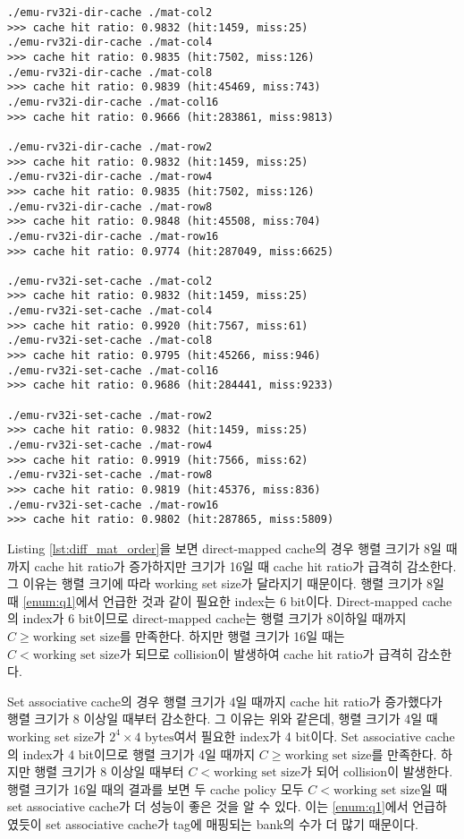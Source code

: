 \documentclass[
    a4paper,
    oneside,
    adjustmath,
    finemath,
    itemph,
    nonfrench,
    11pt
]{oblivoir}
\begin{document}
\begin{enumerate}
        \begin{lstlisting}[caption=Difference by matrix order, label=lst:diff_mat_order]
./emu-rv32i-dir-cache ./mat-col2
>>> cache hit ratio: 0.9832 (hit:1459, miss:25)
./emu-rv32i-dir-cache ./mat-col4
>>> cache hit ratio: 0.9835 (hit:7502, miss:126)
./emu-rv32i-dir-cache ./mat-col8
>>> cache hit ratio: 0.9839 (hit:45469, miss:743)
./emu-rv32i-dir-cache ./mat-col16
>>> cache hit ratio: 0.9666 (hit:283861, miss:9813)

./emu-rv32i-dir-cache ./mat-row2
>>> cache hit ratio: 0.9832 (hit:1459, miss:25)
./emu-rv32i-dir-cache ./mat-row4
>>> cache hit ratio: 0.9835 (hit:7502, miss:126)
./emu-rv32i-dir-cache ./mat-row8
>>> cache hit ratio: 0.9848 (hit:45508, miss:704)
./emu-rv32i-dir-cache ./mat-row16
>>> cache hit ratio: 0.9774 (hit:287049, miss:6625)

./emu-rv32i-set-cache ./mat-col2
>>> cache hit ratio: 0.9832 (hit:1459, miss:25)
./emu-rv32i-set-cache ./mat-col4
>>> cache hit ratio: 0.9920 (hit:7567, miss:61)
./emu-rv32i-set-cache ./mat-col8
>>> cache hit ratio: 0.9795 (hit:45266, miss:946)
./emu-rv32i-set-cache ./mat-col16
>>> cache hit ratio: 0.9686 (hit:284441, miss:9233)

./emu-rv32i-set-cache ./mat-row2
>>> cache hit ratio: 0.9832 (hit:1459, miss:25)
./emu-rv32i-set-cache ./mat-row4
>>> cache hit ratio: 0.9919 (hit:7566, miss:62)
./emu-rv32i-set-cache ./mat-row8
>>> cache hit ratio: 0.9819 (hit:45376, miss:836)
./emu-rv32i-set-cache ./mat-row16
>>> cache hit ratio: 0.9802 (hit:287865, miss:5809)
        \end{lstlisting}

        Listing \ref{lst:diff_mat_order}을 보면 direct-mapped cache의 경우 행렬 크기가 8일 때까지 cache hit ratio가 증가하지만 크기가 16일 때 cache hit ratio가 급격히 감소한다.
        그 이유는 행렬 크기에 따라 working set size가 달라지기 때문이다.
        행렬 크기가 8일 때 \ref{enum:q1}에서 언급한 것과 같이 필요한 index는 6 bit이다.
        Direct-mapped cache의 index가 6 bit이므로 direct-mapped cache는 행렬 크기가 8이하일 때까지 $C \ge \text{working set size}$를 만족한다.
        하지만 행렬 크기가 16일 때는 $C < \text{working set size}$가 되므로 collision이 발생하여 cache hit ratio가 급격히 감소한다.

        Set associative cache의 경우 행렬 크기가 4일 때까지 cache hit ratio가 증가했다가 행렬 크기가 8 이상일 때부터 감소한다.
        그 이유는 위와 같은데, 행렬 크기가 4일 때 working set size가 $2^4 \times 4 \text{ bytes}$여서 필요한 index가 4 bit이다.
        Set associative cache의 index가 4 bit이므로 행렬 크기가 4일 때까지 $C \ge \text{working set size}$를 만족한다.
        하지만 행렬 크기가 8 이상일 때부터 $C < \text{working set size}$가 되어 collision이 발생한다.
        행렬 크기가 16일 때의 결과를 보면 두 cache policy 모두 $C < \text{working set size}$일 때 set associative cache가 더 성능이 좋은 것을 알 수 있다.
        이는 \ref{enum:q1}에서 언급하였듯이 set associative cache가 tag에 매핑되는 bank의 수가 더 많기 때문이다.


\end{enumerate}
\end{document}
